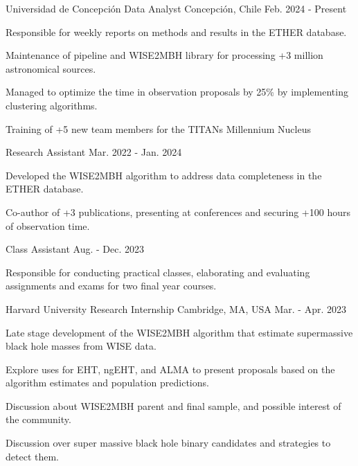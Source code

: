 
\begin{cventries}

\cventry
    {Universidad de Concepción}
    {Data Analyst}
    {Concepción, Chile}
    {Feb. 2024 - Present}
    {
      \begin{cvitems}
        \item{Responsible for weekly reports on methods and results in the ETHER database.}
        \item{Maintenance of pipeline and WISE2MBH library for processing +3 million astronomical sources.}
        \item{Managed to optimize the time in observation proposals by 25\% by implementing clustering algorithms.}
        \item{Training of +5 new team members for the TITANs Millennium Nucleus}
      \end{cvitems}
      \vspace{1em}
    }

  \cventryprevrole
    {Research Assistant}
    {Mar. 2022 - Jan. 2024}
    {
      \begin{cvitems}
        \item{Developed the WISE2MBH algorithm to address data completeness in the ETHER database.}
        \item{Co-author of +3 publications, presenting at conferences and securing +100 hours of observation time.}
      \end{cvitems}
      \vspace{1em}
    }

  \cventryprevrole
    {Class Assistant}
    {Aug. - Dec. 2023}
    {
      \begin{cvitems}
        \item{Responsible for conducting practical classes, elaborating and evaluating assignments and exams for two final year courses.}
      \end{cvitems}
      \vspace{1em}
    }

  \cventry
    {Harvard University}
    {Research Internship}
    {Cambridge, MA, USA}
    {Mar. - Apr. 2023}
    {
      \begin{cvitems}
        \item{Late stage development of the WISE2MBH algorithm that estimate supermassive black hole masses from WISE data.}
        \item{Explore uses for EHT, ngEHT, and ALMA to present proposals based on the algorithm estimates and population predictions.}
        \item {Discussion about WISE2MBH parent and final sample, and possible interest of the community.}
        \item{Discussion over super massive black hole binary candidates and strategies to detect them.}
      \end{cvitems}
      \vspace{1em}
    }


\end{cventries}
